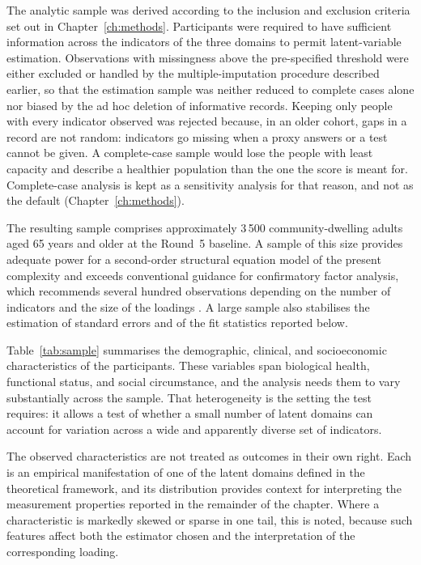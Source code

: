 The analytic sample was derived according to the inclusion and exclusion criteria set out in Chapter~\ref{ch:methods}. Participants were required to have sufficient information across the indicators of the three domains to permit latent-variable estimation. Observations with missingness above the pre-specified threshold were either excluded or handled by the multiple-imputation procedure described earlier, so that the estimation sample was neither reduced to complete cases alone nor biased by the ad hoc deletion of informative records. Keeping only people with every indicator observed was rejected because, in an older cohort, gaps in a record are not random: indicators go missing when a proxy answers or a test cannot be given. A complete-case sample would lose the people with least capacity and describe a healthier population than the one the score is meant for. Complete-case analysis is kept as a sensitivity analysis for that reason, and not as the default (Chapter~\ref{ch:methods}).

The resulting sample comprises approximately 3\,500 community-dwelling adults aged 65 years and older at the Round~5 baseline. A sample of this size provides adequate power for a second-order structural equation model of the present complexity and exceeds conventional guidance for confirmatory factor analysis, which recommends several hundred observations depending on the number of indicators and the size of the loadings \citep{kline_2015, brown_2015}. A large sample also stabilises the estimation of standard errors and of the fit statistics reported below.

Table~\ref{tab:sample} summarises the demographic, clinical, and socioeconomic characteristics of the participants. These variables span biological health, functional status, and social circumstance, and the analysis needs them to vary substantially across the sample. That heterogeneity is the setting the test requires: it allows a test of whether a small number of latent domains can account for variation across a wide and apparently diverse set of indicators.

The observed characteristics are not treated as outcomes in their own right. Each is an empirical manifestation of one of the latent domains defined in the theoretical framework, and its distribution provides context for interpreting the measurement properties reported in the remainder of the chapter. Where a characteristic is markedly skewed or sparse in one tail, this is noted, because such features affect both the estimator chosen and the interpretation of the corresponding loading.


